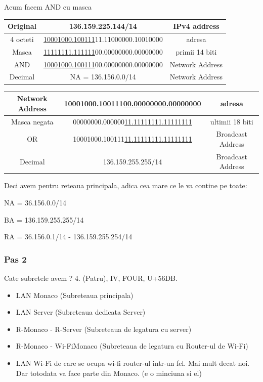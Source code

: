\documentclass{article}
\begin{document}
Acum facem AND cu masca


\begin{center}
   \begin{tabular}{|c|c|c|}
   \hline
        Original & 136.159.225.144/14 &  IPv4 address\\
    \hline
      4 octeti &  \underline{10001000.100111}11.11000000.10010000 & adresa  \\
    \hline
      Masca &  \underline{11111111.111111}00.00000000.00000000 & primii 14 biti \\
    \hline \hline
       AND & \underline{10001000.100111}00.00000000.00000000 &  Network Address\\
    \hline
        Decimal & NA = 136.156.0.0/14 &  Network Address\\
    \hline
    \end{tabular}
\end{center}


\begin{center}
   \begin{tabular}{|c|c|c|}
   \hline

      Network Address &  10001000.100111\underline{00.00000000.00000000} & adresa  \\
    \hline
      Masca negata &  00000000.000000\underline{11.11111111.11111111} & ultimii 18 biti \\
    \hline \hline
       OR & 10001000.100111\underline{11.11111111.11111111} & Broadcast Address\\
    \hline
        Decimal & 136.159.255.255/14 &  Broadcast Address\\
    \hline
    \end{tabular}
\end{center}

Deci avem pentru reteaua principala, adica cea mare ce le va contine pe toate:

NA = 36.156.0.0/14

BA = 136.159.255.255/14

RA = 36.156.0.1/14 - 136.159.255.254/14

\subsubsection{Pas 2}
Cate subretele avem ? 4. (Patru), IV, FOUR, U+56DB.
\begin{itemize}
    \item LAN Monaco (Subreteaua principala)
    \item LAN Server (Subreteaua dedicata Server)
    \item R-Monaco - R-Server (Subreteaua de legatura cu server)
    \item R-Monaco - Wi-FiMonaco (Subreteaua de legatura cu Router-ul de Wi-Fi)

    
    \item LAN Wi-Fi de care se ocupa wi-fi router-ul intr-un fel. Mai mult decat noi. Dar totodata va face parte din Monaco. (e o minciuna si el)
\end{itemize}
\end{document}
